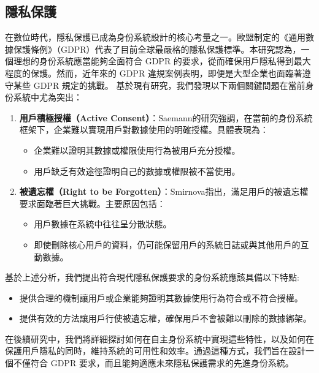 \subsection{隱私保護}
在數位時代，隱私保護已成為身份系統設計的核心考量之一。歐盟制定的《通用數據保護條例》（GDPR）代表了目前全球最嚴格的隱私保護標準。本研究認為，一個理想的身份系統應當能夠全面符合 GDPR 的要求，從而確保用戶隱私得到最大程度的保護。然而，近年來的 GDPR 違規案例表明，即便是大型企業也面臨著遵守某些 GDPR 規定的挑戰。\newline
基於現有研究，我們發現以下兩個關鍵問題在當前身份系統中尤為突出：
\begin{enumerate}
  \item \textbf{用戶積極授權（Active Consent）}：Saemann\cite{saemann2022investigating}的研究強調，在當前的身份系統框架下，企業難以實現用戶對數據使用的明確授權。具體表現為：
        \begin{itemize}
          \item 企業難以證明其數據或權限使用行為被用戶充分授權。
          \item 用戶缺乏有效途徑證明自己的數據或權限被不當使用。
        \end{itemize}
  \item \textbf{被遺忘權（Right to be Forgotten）}：Smirnova\cite{smirnova2024understanding}指出，滿足用戶的被遺忘權要求面臨著巨大挑戰。主要原因包括：
        \begin{itemize}
          \item 用戶數據在系統中往往呈分散狀態。
          \item 即使刪除核心用戶的資料，仍可能保留用戶的系統日誌或與其他用戶的互動數據。
        \end{itemize}
\end{enumerate}
基於上述分析，我們提出符合現代隱私保護要求的身份系統應該具備以下特點:
\begin{itemize}
  \item 提供合理的機制讓用戶或企業能夠證明其數據使用行為符合或不符合授權。
  \item 提供有效的方法讓用戶行使被遺忘權，確保用戶不會被難以刪除的數據綁架。
\end{itemize}
在後續研究中，我們將詳細探討如何在自主身份系統中實現這些特性，以及如何在保護用戶隱私的同時，維持系統的可用性和效率。通過這種方式，我們旨在設計一個不僅符合 GDPR 要求，而且能夠適應未來隱私保護需求的先進身份系統。

